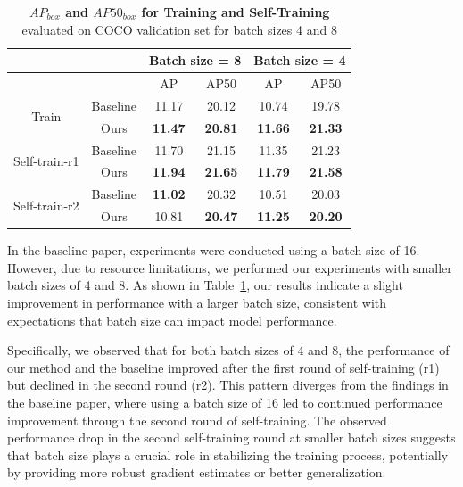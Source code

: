 \begin{table}[htbp]
	\centering
	\begin{tabular}{c|c|cc|cc}
		\toprule
		& & \multicolumn{2}{c|}{Batch size = 8} & \multicolumn{2}{c}{Batch size = 4} \\ \midrule
		& & AP & AP50 & AP & AP50 \\ \midrule
		\multirow{2}{*}{Train} & Baseline & 11.17 & 20.12 & 10.74 & 19.78 \\ 
		& Ours & \textbf{11.47} & \textbf{20.81} & \textbf{11.66} & \textbf{21.33} \\ \midrule
		\multirow{2}{*}{Self-train-r1} & Baseline & 11.70 & 21.15 & 11.35 & 21.23 \\ 
		& Ours & \textbf{11.94} & \textbf{21.65} & \textbf{11.79} & \textbf{21.58} \\ \midrule
		\multirow{2}{*}{Self-train-r2} & Baseline & \textbf{11.02} & 20.32 & 10.51 & 20.03 \\ 
		& Ours & 10.81 & \textbf{20.47} & \textbf{11.25} & \textbf{20.20 }\\ \bottomrule
	\end{tabular}
	\caption[\textbf{\(AP_{box}\) and \(AP50_{box}\) for Training and Self-Training for Different Batch Sizes}]{\textbf{\(AP_{box}\) and \(AP50_{box}\) for Training and Self-Training} evaluated on COCO validation set for batch sizes 4 and 8}
	\label{tab:batch_size_table}
\end{table}

In the baseline paper, experiments were conducted using a batch size of 16. However, due to resource limitations, we performed our experiments with smaller batch sizes of 4 and 8. As shown in Table~\ref{tab:batch_size_table}, our results indicate a slight improvement in performance with a larger batch size, consistent with expectations that batch size can impact model performance.

Specifically, we observed that for both batch sizes of 4 and 8, the performance of our method and the baseline improved after the first round of self-training (r1) but declined in the second round (r2). This pattern diverges from the findings in the baseline paper, where using a batch size of 16 led to continued performance improvement through the second round of self-training. The observed performance drop in the second self-training round at smaller batch sizes suggests that batch size plays a crucial role in stabilizing the training process, potentially by providing more robust gradient estimates or better generalization.

